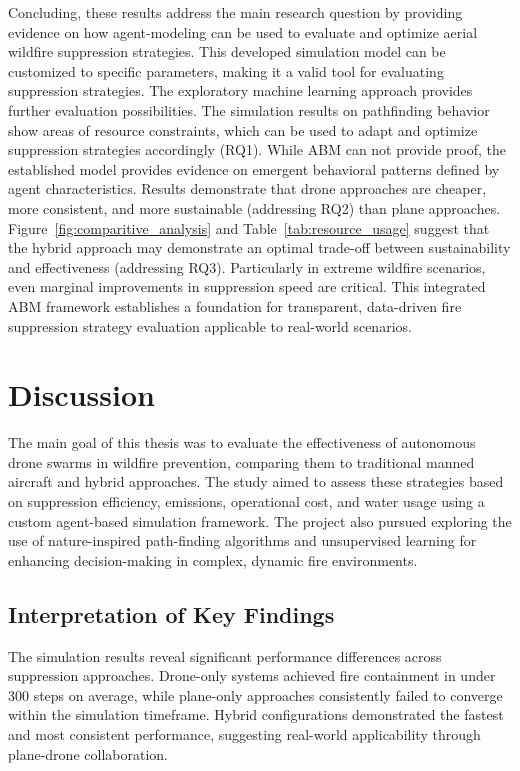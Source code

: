 \documentclass[11pt, a4paper]{article}
\begin{document}
Concluding, these results address the main research question by providing evidence on how agent-modeling can be used to evaluate and optimize aerial wildfire suppression strategies. This developed simulation model can be customized to specific parameters, making it a valid tool for evaluating suppression strategies. The exploratory machine learning approach provides further evaluation possibilities.
The simulation results on pathfinding behavior show areas of resource constraints, which can be used to adapt and optimize suppression strategies accordingly (RQ1).
While ABM can not provide proof, the established model provides evidence on emergent behavioral patterns defined by agent characteristics. 
Results demonstrate that drone approaches are cheaper, more consistent, and more sustainable (addressing RQ2) than plane approaches.
Figure~\ref{fig:comparitive_analysis} and Table~\ref{tab:resource_usage} suggest that the hybrid approach may demonstrate an optimal trade-off between sustainability and effectiveness (addressing RQ3). Particularly in extreme wildfire scenarios, even marginal improvements in suppression speed are critical. This integrated ABM framework establishes a foundation for transparent, data-driven fire suppression strategy evaluation applicable to real-world scenarios.

\section{Discussion}
\label{sec:discussion}
The main goal of this thesis was to evaluate the effectiveness of autonomous drone swarms in wildfire prevention, comparing them to traditional manned aircraft and hybrid approaches. The study aimed to assess these strategies based on suppression efficiency, emissions, operational cost, and water usage using a custom agent-based simulation framework. The project also pursued exploring the use of nature-inspired path-finding algorithms and unsupervised learning for enhancing decision-making in complex, dynamic fire environments.
\subsection{Interpretation of Key Findings}

The simulation results reveal significant performance differences across suppression approaches. Drone-only systems achieved fire containment in under 300 steps on average, while plane-only approaches consistently failed to converge within the simulation timeframe. Hybrid configurations demonstrated the fastest and most consistent performance, suggesting real-world applicability through plane-drone collaboration.
\end{document}
